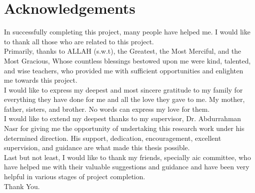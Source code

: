 \chapter*{Acknowledgements}

\noindent
In successfully completing this project, many people have helped me. I would like to thank all those who are related to this project. \\[4pt]

Primarily, thanks to ALLAH (s.w.t), the Greatest, the Most Merciful, and the Most Gracious,
Whose countless blessings bestowed upon me were kind, talented, and wise teachers, who
provided me with sufficient opportunities and enlighten me towards this project. \\[4pt]

I would like to express my deepest and most sincere gratitude to my family for everything they have done for me and all the love they gave to me. My mother, father, sisters, and brother. No words can express my love for them. \\[4pt]

I would like to extend my deepest thanks to my supervisor, Dr. Abdurrahman Nasr for
giving me the opportunity of undertaking this research work under his determined
direction. His support, dedication, encouragement, excellent supervision, and guidance
are what made this thesis possible. \\[4pt]

Last but not least, I would like to thank my friends, specially \acrfull{aic} committee, who have helped me with their valuable suggestions and guidance and have been very helpful in various stages of project completion. \\[16pt]

\noindent
Thank You.